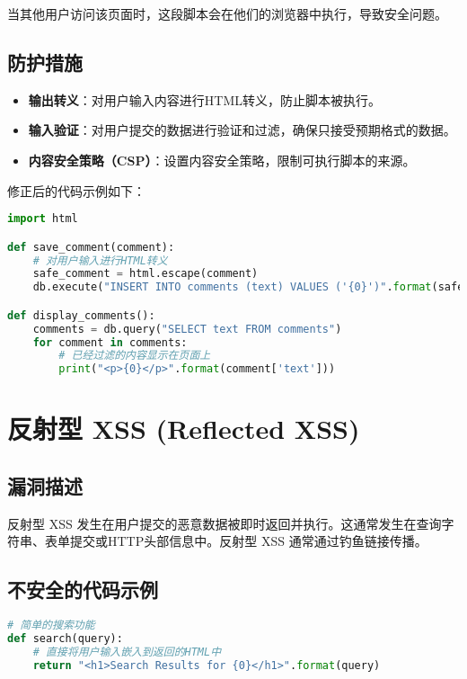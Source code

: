 \documentclass{article}
\begin{document}
当其他用户访问该页面时，这段脚本会在他们的浏览器中执行，导致安全问题。

\subsection{防护措施}
\begin{itemize}
    \item \textbf{输出转义}：对用户输入内容进行HTML转义，防止脚本被执行。
    \item \textbf{输入验证}：对用户提交的数据进行验证和过滤，确保只接受预期格式的数据。
    \item \textbf{内容安全策略（CSP）}：设置内容安全策略，限制可执行脚本的来源。
\end{itemize}

修正后的代码示例如下：

\begin{lstlisting}[language=Python, caption=存储型 XSS 的安全代码示例]
import html

def save_comment(comment):
    # 对用户输入进行HTML转义
    safe_comment = html.escape(comment)
    db.execute("INSERT INTO comments (text) VALUES ('{0}')".format(safe_comment))

def display_comments():
    comments = db.query("SELECT text FROM comments")
    for comment in comments:
        # 已经过滤的内容显示在页面上
        print("<p>{0}</p>".format(comment['text']))
\end{lstlisting}

\section{反射型 XSS (Reflected XSS)}

\subsection{漏洞描述}
反射型 XSS 发生在用户提交的恶意数据被即时返回并执行。这通常发生在查询字符串、表单提交或HTTP头部信息中。反射型 XSS 通常通过钓鱼链接传播。

\subsection{不安全的代码示例}

\begin{lstlisting}[language=Python, caption=反射型 XSS 的不安全代码示例]
# 简单的搜索功能
def search(query):
    # 直接将用户输入嵌入到返回的HTML中
    return "<h1>Search Results for {0}</h1>".format(query)
\end{lstlisting}
\end{document}
